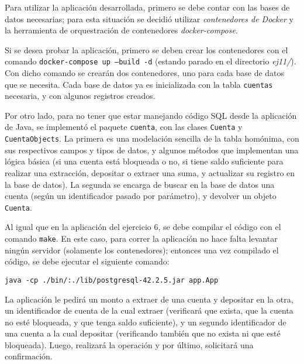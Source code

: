 Para utilizar la aplicación desarrollada, primero se debe contar con las bases de datos necesarias; para esta situación se decidió utilizar \emph{contenedores de Docker} y la herramienta de orquestración de contenedores \emph{docker-compose}. 

Si se desea probar la aplicación, primero se deben crear los contenedores con el comando \texttt{docker-compose up --build -d} (estando parado en el directorio \emph{ej11/}). Con dicho comando se crearán dos contenedores, uno para cada base de datos que se necesita. Cada base de datos ya es inicializada con la tabla \texttt{cuentas} necesaria, y con algunos registros creados.

Por otro lado, para no tener que estar manejando código SQL desde la aplicación de Java, se implementó el paquete \texttt{cuenta}, con las clases \texttt{Cuenta} y \texttt{CuentaObjects}. La primera es una modelación sencilla de la tabla homónima, con sus respectivos campos y tipos de datos, y algunos métodos que implementan una lógica básica (si una cuenta está bloqueada o no, si tiene saldo suficiente para realizar una extracción, depositar o extraer una suma, y actualizar su registro en la base de datos). La segunda se encarga de buscar en la base de datos una cuenta (según un identificador pasado por parámetro), y devolver un objeto \texttt{Cuenta}.

Al igual que en la aplicación del ejercicio 6, se debe compilar el código con el comando \texttt{make}. En este caso, para correr la aplicación no hace falta levantar ningún servidor (solamente los contenedores); entonces una vez compilado el código, se debe ejecutar el siguiente comando:

\begin{lstlisting}[title={Ejemplo de invocación de la aplicación (correr estando parado en el directorio \emph{ej11})}]
java -cp ./bin/:./lib/postgresql-42.2.5.jar app.App 
\end{lstlisting}

La aplicación le pedirá un monto a extraer de una cuenta y depositar en la otra, un identificador de cuenta de la cual extraer (verificará que exista, que la cuenta no esté bloqueada, y que tenga saldo suficiente), y un segundo identificador de una cuenta a la cual depositar (verificando también que no exista ni que esté bloqueada). Luego, realizará la operación y por último, solicitará una confirmación.


\clearpage
\printbibliography



